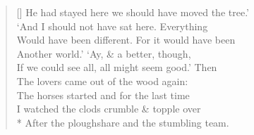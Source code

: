 \documentclass[MAIN]{subfiles}
\begin{document}
\begin{verse}[\versewidth]
He had stayed here we should have moved the tree.'\\
`And I should not have sat here. Everything\\
Would have been different. For it would have been\\
Another world.' `Ay, \& a better, though,\\
If we could see all, all might seem good.' Then\\
The lovers came out of the wood again:\\
The horses started and for the last time\\
I watched the clods crumble \& topple over\\*
After the ploughshare and the stumbling team.
\end{verse}
\end{document}
